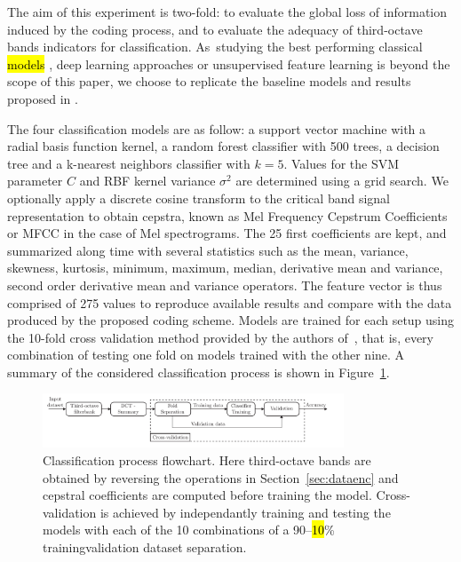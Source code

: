 \documentclass[sensors,article,accept,moreauthors,pdftex,10pt,a4paper]{mdpi}
\begin{document}
The aim of this experiment is two-fold: to evaluate the global loss of information induced by the coding process, and to evaluate the adequacy of third-octave bands indicators for classification. As~studying the best performing classical \hl{models} \citep{ntalampiras2013}, %
deep learning approaches \citep{salamon2017} or unsupervised feature learning is beyond the scope of this paper, we choose to replicate the baseline models and results proposed in \cite{salamon2014}.

The four classification models are as follow: a support vector machine with a radial basis function kernel, a random forest classifier with 500 trees, a decision tree and a k-nearest neighbors classifier with $k = 5$. Values for the SVM parameter $C$ and RBF kernel variance $\sigma^2$ are determined using a grid search. We optionally apply a discrete cosine transform to the critical band signal representation to obtain cepstra, known as Mel Frequency Cepstrum Coefficients or MFCC in the case of Mel spectrograms. The 25 first coefficients are kept, and summarized along time with several statistics such as the mean, variance, skewness, kurtosis, minimum, maximum, median, derivative mean and variance, second order derivative mean and variance operators. The feature vector is thus comprised of 275 values to reproduce available results and compare with the data produced by the proposed coding scheme. Models are trained for each setup using the 10-fold cross validation method provided by the authors \mbox{of \cite{salamon2014},} that is, every combination of testing one fold on models trained with the other nine. A summary of the considered classification process is shown in Figure~\ref{fig:class_flwc}.

\begin{figure}[H]
	\centering
		\includegraphics[width=0.8\textwidth]{figures/class.pdf}
	\caption{Classification process flowchart. Here third-octave bands are obtained by reversing the operations in Section~\ref{sec:dataenc} and cepstral coefficients are computed before training the model. Cross-validation is achieved by independantly training and testing the models with each of the 10 combinations of a 90--\hl{10}\% training\highlight{--}validation dataset separation.}%
	\label{fig:class_flwc}
\end{figure}
\end{document}
